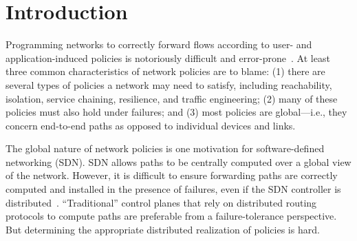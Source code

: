 \section{Introduction}
\label{sec:intro}


Programming networks to correctly forward flows according to user- and
application-induced policies is notoriously difficult and
error-prone~\cite{TODO-see-Propane}. At least three common characteristics of
network policies are to blame: (1) there are several types of policies a
network may need to satisfy, including reachability, isolation, service
chaining, resilience, and traffic engineering; (2) many of these policies must
also hold under failures; and (3) most policies are global---i.e., they
concern end-to-end paths as opposed to individual devices and links.


The global nature of network policies is one motivation for software-defined
networking (SDN). SDN allows paths to be centrally computed over a global view
of the network. However, it is difficult to ensure forwarding paths are
correctly computed and installed in the presence of failures, even if the SDN
controller is distributed~\cite{TODO-see-Propane-or-Akella-HotNets}.
``Traditional'' control planes that rely on distributed routing protocols to
compute paths are preferable from a failure-tolerance perspective. But
determining the appropriate distributed realization of policies is hard.
   



